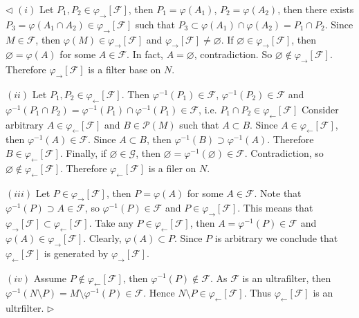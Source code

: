 \documentclass[12pt]{article}
\newenvironment{proof}{\par $\triangleleft$}{$\triangleright$}
\begin{document}
\begin{proof} $(i)$ Let $P_1,P_2\in\varphi_{\rightarrow}[\mathcal{F}]$, then
    $P_1=\varphi(A_1)$, $P_2=\varphi(A_2)$, then there exists
    $P_3=\varphi(A_1\cap A_2)\in\varphi_{\rightarrow}[\mathcal{F}]$ such that
    $P_3\subset\varphi(A_1)\cap\varphi(A_2)=P_1\cap P_2$. Since
    $M\in\mathcal{F}$, then $\varphi(M)\in\varphi_{\rightarrow}[\mathcal{F}]$
    and $\varphi_{\rightarrow}[\mathcal{F}]\neq\varnothing$. If
    $\varnothing\in\varphi_{\rightarrow}[\mathcal{F}]$, then
    $\varnothing=\varphi(A)$ for some $A\in\mathcal{F}$. In fact,
    $A=\varnothing$, contradiction. So
    $\varnothing\notin\varphi_{\rightarrow}[\mathcal{F}]$. Therefore
    $\varphi_{\rightarrow}[\mathcal{F}]$ is a filter base on $N$.

    $(ii)$ Let $P_1,P_2\in\varphi_{\leftarrow}[\mathcal{F}]$. Then
    $\varphi^{-1}(P_1)\in\mathcal{F}$, $\varphi^{-1}(P_2)\in\mathcal{F}$ and
    $\varphi^{-1}(P_1\cap
        P_2)=\varphi^{-1}(P_1)\cap\varphi^{-1}(P_1)\in\mathcal{F}$, i.e. $P_1\cap
        P_2\in\varphi_{\leftarrow}[\mathcal{F}]$ Consider arbitrary
    $A\in\varphi_{\leftarrow}[\mathcal{F}]$ and $B\in\mathcal{P}(M)$ such that
    $A\subset B$. Since $A\in\varphi_{\leftarrow}[\mathcal{F}]$, then
    $\varphi^{-1}(A)\in\mathcal{F}$. Since $A\subset B$, then
    $\varphi^{-1}(B)\supset\varphi^{-1}(A)$. Therefore
    $B\in\varphi_{\leftarrow}[\mathcal{F}]$. Finally, if
    $\varnothing\in\mathcal{G}$, then
    $\varnothing=\varphi^{-1}(\varnothing)\in\mathcal{F}$. Contradiction, so
    $\varnothing\notin\varphi_{\leftarrow}[\mathcal{F}]$. Therefore
    $\varphi_{\leftarrow}[\mathcal{F}]$ is a filer on $N$.

    $(iii)$ Let $P\in\varphi_{\rightarrow}[\mathcal{F}]$, then $P=\varphi(A)$
    for some $A\in\mathcal{F}$. Note that $\varphi^{-1}(P)\supset
        A\in\mathcal{F}$, so $\varphi^{-1}(P)\in\mathcal{F}$ and
    $P\in\varphi_{\rightarrow}[\mathcal{F}]$. This means that
    $\varphi_{\rightarrow}[\mathcal{F}]\subset
        \varphi_{\leftarrow}[\mathcal{F}]$. Take any $P\in
        \varphi_{\leftarrow}[\mathcal{F}]$, then $A=\varphi^{-1}(P)\in\mathcal{F}$
    and $\varphi(A)\in\varphi_{\rightarrow}[\mathcal{F}]$. Clearly,
    $\varphi(A)\subset P$. Since $P$ is arbitrary we conclude that
    $\varphi_{\leftarrow}[\mathcal{F}]$ is generated by
    $\varphi_{\rightarrow}[\mathcal{F}]$.

    $(iv)$ Assume $P\notin\varphi_{\leftarrow}[\mathcal{F}]$, then
    $\varphi^{-1}(P)\notin\mathcal{F}$. As $\mathcal{F}$ is an ultrafilter, then
    $\varphi^{-1}(N\setminus P)=M\setminus\varphi^{-1}(P)\in\mathcal{F}$. Hence
    $N\setminus P\in\varphi_{\leftarrow}[\mathcal{F}]$. Thus
    $\varphi_{\leftarrow}[\mathcal{F}]$ is an ultrfilter.
\end{proof}
\end{document}

